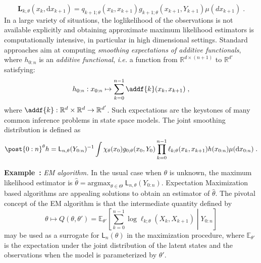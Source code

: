 \documentclass{article}
\newcommand{\1}{\mathbbm{1}}
\newcommand{\uk}[1]{\mathbf{L}_{#1}}
\newcommand{\md}[1]{g_{#1}}
\newcommand{\llh}[1]{\mathsf{L}_{#1}}
\newcommand{\parvec}{\theta}
\newcommand{\parspace}{\Theta}
\newcommand{\af}[1]{h_{#1}}
\newcommand{\hd}[1]{q_{#1}}
\def\pE{\mathbb{E}}
\newcommand{\rset}{\ensuremath{\mathbb{R}}}
\newcommand{\rmd}{\ensuremath{\mathrm{d}}}
\newcommand{\eqsp}{\;}
\newcommand{\qg}[1]{\ell_{#1}}
\newcounter{example}[section]
\newenvironment{example}[1][]{\refstepcounter{example}\par\medskip
   \noindent \textbf{Example~\theexample:} \textit{#1} \text \rmfamily}{\medskip}
\begin{document}
$$
\uk{k,\theta}(x_k, \rmd x_{k+ 1})  = \hd{k+1;\parvec}(x_{k}, x_{k+1})\md{k+1;\parvec}(x_{k+1},Y_{k+1})\mu(dx_{k+1})\eqsp.
$$
In a large variety of situations, the loglikelihood of the observations is not available explicitly and obtaining approximate maximum likelihood estimators is computationally intensive, in particular in high dimensional settings. Standard approaches  aim at computing \textit{smoothing expectations of additive functionals},  where $\af{0:n}$ is an \textit{additive functional}, \textit{i.e.} a function from $\rset^{d \times (n + 1)}$ to $\rset^{d'}$ satisfying:
\begin{equation}
\label{eq:additive:functional}
\af{0:n}: x_{0:n} \mapsto \sum_{k=0}^{n-1}\addf{k}(x_{k},x_{k+1})\eqsp,
\end{equation}
where $\addf{k}:\rset^{d} \times \rset^{d}\to\rset^{d'}$.
Such expectations are the keystones of many common inference problems in state space models. The joint smoothing distribution is defined as
$$
\post{0:n}^{\parvec} h = \llh{n,\parvec}(Y_{0:n})^{-1} \int \chi_\theta(x_0)\md{0;\parvec}(x_{0},Y_{0})\prod_{k=0}^{n-1}\qg{k;\parvec}(x_{k},x_{k+1})h(x_{0:n})\mu(\rmd x_{0:n})\eqsp.
$$

\begin{example}[EM algorithm.]
\label{ex:em:algorithm}
In the usual case when $\theta$ is unknown, the maximum likelihood estimator is $\widehat \parvec = \mathrm{argmax}_{\parvec\in\parspace}\eqsp\llh{n,\parvec}(Y_{0:n})$. Expectation Maximization based algorithms are appealing solutions to obtain an estimator of $\hat \parvec$.
The pivotal concept of the EM algorithm is that the intermediate quantity defined by
\begin{equation*}
\parvec\mapsto Q(\parvec,\parvec') = \pE_{\parvec'}\left[\sum_{k=0}^{n-1} \log \qg{k;\parvec}(X_{k}, X_{k+1})\middle | Y_{0:n}\right] 
\end{equation*}
may be used as a surrogate for $\llh{n}(\parvec)$ in the maximization procedure,  where $\pE_{\parvec'}$ is the expectation under the joint distribution of the latent states and the observations when the model is parameterized by $\parvec'$. 
\end{example}
\end{document}
